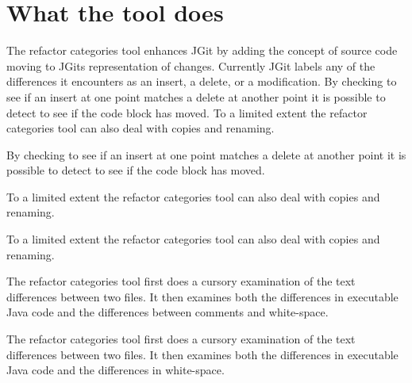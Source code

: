 
\section{What the tool does}
The refactor categories tool enhances JGit by adding the concept of source code moving to JGits representation of changes.
Currently JGit labels any of the differences it encounters as an insert, a delete, or a modification.  By checking to see if an insert at one point matches a delete at another point it is possible to detect to see if the code block has moved.
To a limited extent the refactor categories tool can also deal with copies and renaming.

By checking to see if an insert at one point matches a delete at another point it is possible to detect to see if the code block has moved.

To a limited extent the refactor categories tool can also deal with copies and renaming.

To a limited extent the refactor categories tool can also deal with copies and renaming.

The refactor categories tool first does a cursory examination of the text differences between two files. It then examines both the differences in executable Java code and the differences between comments and white-space. 
% 


The refactor categories tool first does a cursory examination of the text differences between two files. It then examines both the differences in executable Java code and the differences in white-space.


